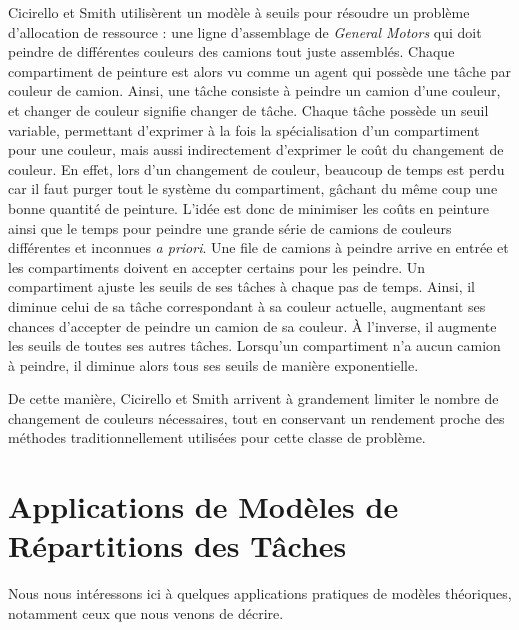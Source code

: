         Cicirello et Smith \cite{cicirello_wasp-like_2004} utilisèrent un modèle à seuils pour résoudre un problème d'allocation de ressource : une ligne d'assemblage de \textit{General Motors} qui doit peindre de différentes couleurs des camions tout juste assemblés. Chaque compartiment de peinture est alors vu comme un agent qui possède une tâche par couleur de camion. Ainsi, une tâche consiste à peindre un camion d'une couleur, et changer de couleur signifie changer de tâche. Chaque tâche possède un seuil variable, permettant d'exprimer à la fois la spécialisation d'un compartiment pour une couleur, mais aussi indirectement d'exprimer le coût du changement de couleur. En effet, lors d'un changement de couleur, beaucoup de temps est perdu car il faut purger tout le système du compartiment, gâchant du même coup une bonne quantité de peinture. L'idée est donc de minimiser les coûts en peinture ainsi que le temps pour peindre une grande série de camions de couleurs différentes et inconnues \textit{a priori}. Une file de camions à peindre arrive en entrée et les compartiments doivent en accepter certains pour les peindre. Un compartiment ajuste les seuils de ses tâches à chaque pas de temps. Ainsi, il diminue celui de sa tâche correspondant à sa couleur actuelle, augmentant ses chances d'accepter de peindre un camion de sa couleur. À l'inverse, il augmente les seuils de toutes ses autres tâches. Lorsqu'un compartiment n'a aucun camion à peindre, il diminue alors tous ses seuils de manière exponentielle.
        
        De cette manière, Cicirello et Smith arrivent à grandement limiter le nombre de changement de couleurs nécessaires, tout en conservant un rendement proche des méthodes traditionnellement utilisées pour cette classe de problème.
        
        
        \section{Applications de Modèles de Répartitions des Tâches}
        Nous nous intéressons ici à quelques applications pratiques de modèles théoriques, notamment ceux que nous venons de décrire. 
        
